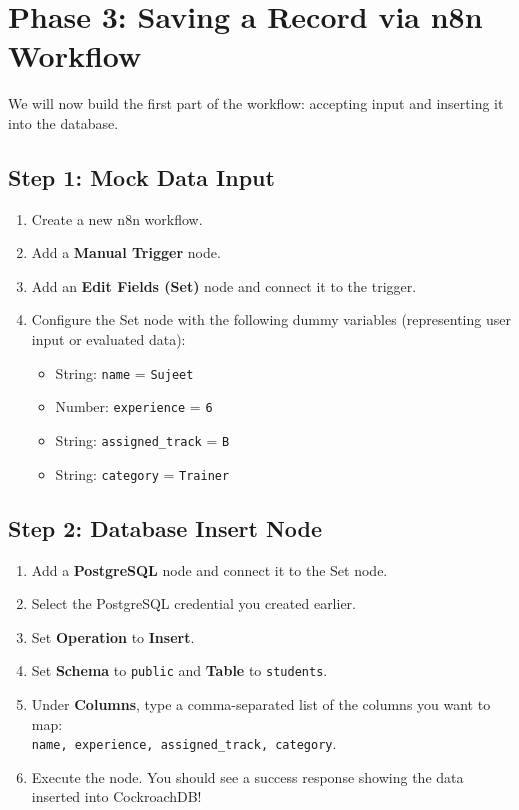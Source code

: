 \documentclass[12pt,a4paper]{article}
\begin{document}
\section{Phase 3: Saving a Record via n8n Workflow}
We will now build the first part of the workflow: accepting input and inserting it into the database.

\subsection{Step 1: Mock Data Input}
\begin{enumerate}
    \item Create a new n8n workflow.
    \item Add a \textbf{Manual Trigger} node.
    \item Add an \textbf{Edit Fields (Set)} node and connect it to the trigger.
    \item Configure the Set node with the following dummy variables (representing user input or evaluated data):
    \begin{itemize}
        \item String: \texttt{name} = \texttt{Sujeet}
        \item Number: \texttt{experience} = \texttt{6}
        \item String: \texttt{assigned\_track} = \texttt{B}
        \item String: \texttt{category} = \texttt{Trainer}
    \end{itemize}
\end{enumerate}

\subsection{Step 2: Database Insert Node}
\begin{enumerate}
    \item Add a \textbf{PostgreSQL} node and connect it to the Set node.
    \item Select the PostgreSQL credential you created earlier.
    \item Set \textbf{Operation} to \textbf{Insert}.
    \item Set \textbf{Schema} to \texttt{public} and \textbf{Table} to \texttt{students}.
    \item Under \textbf{Columns}, type a comma-separated list of the columns you want to map: \\
    \texttt{name, experience, assigned\_track, category}.
    \item Execute the node. You should see a success response showing the data inserted into CockroachDB!
\end{enumerate}
\end{document}
